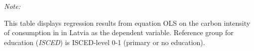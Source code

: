 \begin{table}[htbp!]
\begin{adjustbox}{width = 1\textwidth, max height = 0.95\textheight, center}
\begin{threeparttable}[b]
         \begin{tablenotes}\item \medskip \textit{Note:}
            \item This table displays regression results from equation OLS on the carbon intensity of consumption in  in Latvia as the dependent variable. Reference group for education (\textit{ISCED}) is ISCED-level 0-1 (primary or no education).
         \end{tablenotes}
      \end{threeparttable}
   \end{adjustbox}
\end{table}


